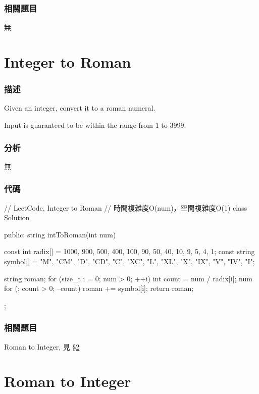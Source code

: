 \subsubsection{相關題目}
\begindot
\item 無
\myenddot


\section{Integer to Roman} %
\label{sec:integer-to-roman}


\subsubsection{描述}
Given an integer, convert it to a roman numeral.

Input is guaranteed to be within the range from 1 to 3999.


\subsubsection{分析}
無


\subsubsection{代碼}
\begin{Code}
// LeetCode, Integer to Roman
// 時間複雜度O(num)，空間複雜度O(1)
class Solution {
public:
    string intToRoman(int num) {
        const int radix[] = {1000, 900, 500, 400, 100, 90,
                50, 40, 10, 9, 5, 4, 1};
        const string symbol[] = {"M", "CM", "D", "CD", "C", "XC",
                "L", "XL", "X", "IX", "V", "IV", "I"};

        string roman;
        for (size_t i = 0; num > 0; ++i) {
            int count = num / radix[i];
            num %
            for (; count > 0; --count) roman += symbol[i];
        }
        return roman;
    }
};
\end{Code}


\subsubsection{相關題目}
\begindot
\item Roman to Integer, 見 \S \ref{sec:roman-to-integer}
\myenddot


\section{Roman to Integer} %
\label{sec:roman-to-integer}



